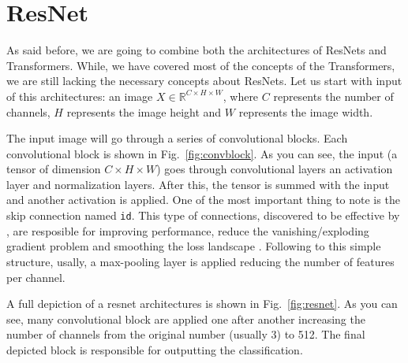 \section{ResNet}\label{sect:resnet}
As said before, we are going to combine both the architectures of ResNets and Transformers. While, we have covered most of the concepts of the Transformers, we are still lacking the necessary concepts about ResNets. Let us start with input of this architectures: an image $X\in\mathbb{R}^{C\times H \times W}$, where $C$ represents the number of channels, $H$ represents the image height and $W$ represents the image width.

The input image will go through a series of convolutional blocks. Each convolutional block is shown in Fig.~\ref{fig:convblock}. As you can see, the input (a tensor of dimension $C\times H \times W$) goes through convolutional layers an activation layer and normalization layers. After this, the tensor is summed with the input and another activation is applied. One of the most important thing to note is the skip connection named \texttt{id}. This type of connections, discovered to be effective by \cite{He16}, are resposible for improving performance, reduce the vanishing/exploding gradient problem and smoothing the loss landscape \cite{Li17}. Following to this simple structure, usally, a max-pooling layer is applied reducing the number of features per channel. 

A full depiction of a resnet architectures is shown in Fig.~\ref{fig:resnet}. As you can see, many convolutional block are applied one after another increasing the number of channels from the original number (usually 3) to 512. The final depicted block is responsible for outputting the classification. 

